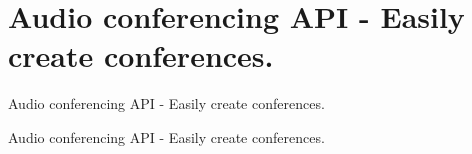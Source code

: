 \section{Audio conferencing A\+PI -\/ Easily create conferences.}
\label{group__mediastreamer2__audio__conference}


Audio conferencing A\+PI -\/ Easily create conferences.  


Audio conferencing A\+PI -\/ Easily create conferences. 

